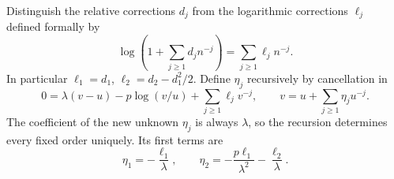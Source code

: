 \documentclass[11pt,letterpaper]{article}
\theoremstyle{remark}\newtheorem{remark}[theorem]{Remark}
\begin{document}
Distinguish the relative corrections $d_j$ from the logarithmic
corrections $\ell_j$ defined formally by
\begin{equation}\label{ivk:two:logcorrections}
 \log\left(1+\sum_{j\ge1}d_jn^{-j}\right)
       =\sum_{j\ge1}\ell_jn^{-j}.
\end{equation}
In particular $\ell_1=d_1$, $\ell_2=d_2-d_1^2/2$. Define $\eta_j$
recursively by cancellation in
\begin{equation}\label{ivk:two:inverserec}
 0=\lambda(v-u)-p\log(v/u)+\sum_{j\ge1}\ell_jv^{-j},
 \qquad v=u+\sum_{j\ge1}\eta_ju^{-j}.
\end{equation}
The coefficient of the new unknown $\eta_j$ is always $\lambda$,
so the recursion determines every fixed order uniquely. Its first
terms are
\begin{equation}\label{ivk:two:eta12}
 \eta_1=-\frac{\ell_1}{\lambda},\qquad
 \eta_2=-\frac{p\ell_1}{\lambda^2}-\frac{\ell_2}{\lambda}.
\end{equation}
\end{document}

